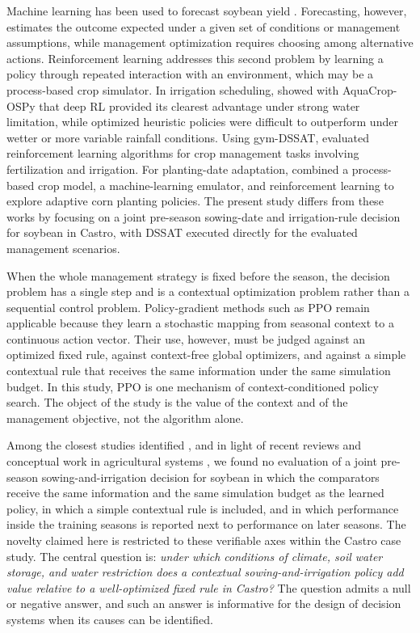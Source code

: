 \documentclass[times,final,authoryear]{elsarticle}
\begin{document}
Machine learning has been used to forecast soybean yield \citep{vonbloh2023mlsoybean, schwalbert2020soybeanforecast}. Forecasting, however, estimates the outcome expected under a given set of conditions or management assumptions, while management optimization requires choosing among alternative actions. Reinforcement learning addresses this second problem by learning a policy through repeated interaction with an environment, which may be a process-based crop simulator. In irrigation scheduling, \citet{kelly2024assessing} showed with AquaCrop-OSPy that deep RL provided its clearest advantage under strong water limitation, while optimized heuristic policies were difficult to outperform under wetter or more variable rainfall conditions. Using gym-DSSAT, \citet{balderas2025comparative} evaluated reinforcement learning algorithms for crop management tasks involving fertilization and irrigation. For planting-date adaptation, \citet{noa2026hybrid} combined a process-based crop model, a machine-learning emulator, and reinforcement learning to explore adaptive corn planting policies. The present study differs from these works by focusing on a joint pre-season sowing-date and irrigation-rule decision for soybean in Castro, with DSSAT executed directly for the evaluated management scenarios.

When the whole management strategy is fixed before the season, the decision problem has a single step and is a contextual optimization problem rather than a sequential control problem. Policy-gradient methods such as PPO remain applicable because they learn a stochastic mapping from seasonal context to a continuous action vector. Their use, however, must be judged against an optimized fixed rule, against context-free global optimizers, and against a simple contextual rule that receives the same information under the same simulation budget. In this study, PPO is one mechanism of context-conditioned policy search. The object of the study is the value of the context and of the management objective, not the algorithm alone.

Among the closest studies identified \citep{kelly2024assessing, balderas2025comparative, noa2026hybrid}, and in light of recent reviews and conceptual work in agricultural systems \citep{carolan2026objective, kumari2026optimization, adel2026drones}, we found no evaluation of a joint pre-season sowing-and-irrigation decision for soybean in which the comparators receive the same information and the same simulation budget as the learned policy, in which a simple contextual rule is included, and in which performance inside the training seasons is reported next to performance on later seasons. The novelty claimed here is restricted to these verifiable axes within the Castro case study. The central question is: \emph{under which conditions of climate, soil water storage, and water restriction does a contextual sowing-and-irrigation policy add value relative to a well-optimized fixed rule in Castro?} The question admits a null or negative answer, and such an answer is informative for the design of decision systems when its causes can be identified.
\end{document}
